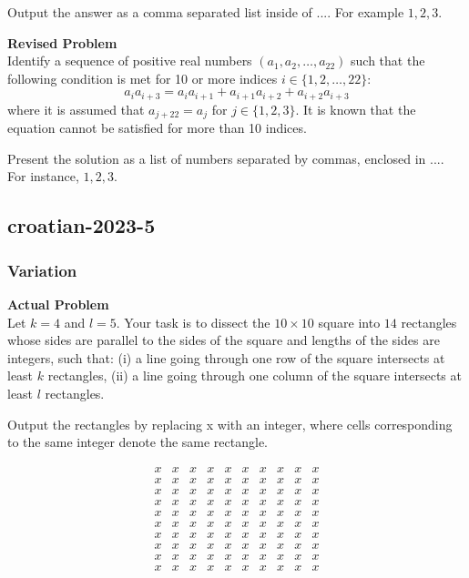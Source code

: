 Output the answer as a comma separated list inside of $\boxed{...}$. For example $\boxed{1, 2, 3}$.

\textbf{Revised Problem}\\
Identify a sequence of positive real numbers $(a_1, a_2, \ldots, a_{22})$ such that the following condition is met for 10 or more indices $i \in \{ 1, 2, \ldots, 22 \}$: $$ a_i a_{i+3} = a_i a_{i+1} + a_{i+1} a_{i+2} + a_{i+2} a_{i+3}$$ where it is assumed that $a_{j+22} = a_j$ for $j \in \{1, 2, 3\}$. It is known that the equation cannot be satisfied for more than 10 indices.

Present the solution as a list of numbers separated by commas, enclosed in $\boxed{...}$. For instance, $\boxed{1, 2, 3}$.

\subsection{croatian-2023-5}
\subsubsection{Variation}
\textbf{Actual Problem}\\
Let $k = 4$ and $l = 5$. Your task is to dissect the $10 \times 10$ square into $14$ rectangles whose sides are parallel to the sides of the square
and lengths of the sides are integers, such that: (i) a line going through one row of the square intersects at least $k$ rectangles, (ii) a line going through one column of the square
intersects at least $l$ rectangles.

Output the rectangles by replacing x with an integer, where cells corresponding to the same integer denote the same rectangle.

$$\begin{array}{cccccccccc}
x & x & x & x & x & x & x & x & x & x \\
x & x & x & x & x & x & x & x & x & x \\
x & x & x & x & x & x & x & x & x & x \\
x & x & x & x & x & x & x & x & x & x \\
x & x & x & x & x & x & x & x & x & x \\
x & x & x & x & x & x & x & x & x & x \\
x & x & x & x & x & x & x & x & x & x \\
x & x & x & x & x & x & x & x & x & x \\
x & x & x & x & x & x & x & x & x & x \\
x & x & x & x & x & x & x & x & x & x \\
\end{array}$$

